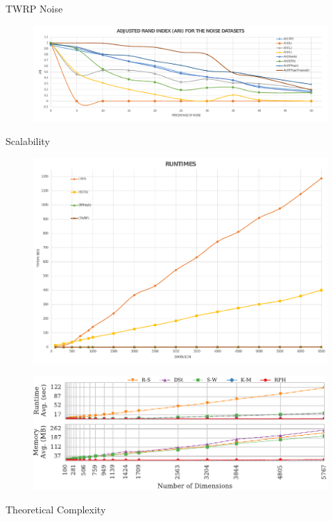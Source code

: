 \documentclass[12pt]{beamer}
\begin{document}
\begin{frame}[plain]{TWRP Noise}
 \begin{figure}
 \centerline{\includegraphics[width=1.1\textwidth]{figs/ari_noise}}
\end{figure}
\end{frame}


\begin{frame}[plain]{Scalability}
 \begin{figure}
 \centerline{\includegraphics[width=.65\textwidth]{figs/Scalability_Synthetic}}
\end{figure}
\vspace*{-3\bigskipamount}
 \begin{figure}
 \centerline{\includegraphics[width=.65\textwidth]{figs/runtimeGraphs}}
\end{figure}
\end{frame}

\begin{frame}[plain]{Theoretical Complexity}
 
 \begin{table}
\centering
{}
 \end{table}
\end{frame}
\end{document}
